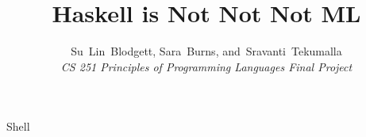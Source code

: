 \documentclass[journal]{IEEEtran}
\begin{document}
%
\title{Haskell is Not Not Not ML}
%
%
%

\author{Su~Lin~Blodgett,\IEEEmembership{}
        Sara~Burns,\IEEEmembership{}
        and~Sravanti~Tekumalla\IEEEmembership{}\\ \textit{CS 251 Principles of Programming Languages Final Project}%
}

% 
%



\markboth{}%
{Shell \MakeLowercase{\textit{}}}
% 




\end{document}
